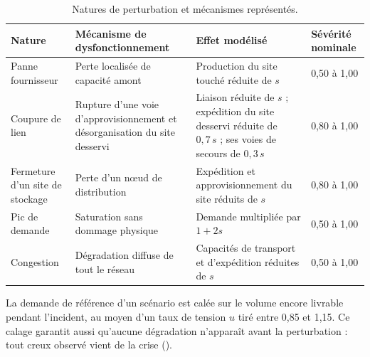 \begin{table}[htbp]
\caption{Natures de perturbation et mécanismes représentés.}
\label{tab:d3}
\footnotesize
\begin{tabularx}{\textwidth}{@{}P{2.4cm}LLP{1.7cm}@{}}
\toprule
\textbf{Nature} & \textbf{Mécanisme de dysfonctionnement} & \textbf{Effet modélisé} & \textbf{Sévérité nominale} \\
\toprule
Panne fournisseur & Perte localisée de capacité amont & Production du site touché réduite de $s$ & 0,50 à 1,00 \\
\midrule
Coupure de lien & Rupture d'une voie d'approvisionnement et désorganisation du site desservi & Liaison réduite de $s$ ; expédition du site desservi réduite de $0{,}7\,s$ ; ses voies de secours de $0{,}3\,s$ & 0,80 à 1,00 \\
\midrule
Fermeture d'un site de stockage & Perte d'un nœud de distribution & Expédition et approvisionnement du site réduits de $s$ & 0,80 à 1,00 \\
\midrule
Pic de demande & Saturation sans dommage physique & Demande multipliée par $1 + 2s$ & 0,50 à 1,00 \\
\midrule
Congestion & Dégradation diffuse de tout le réseau & Capacités de transport et d'expédition réduites de $s$ & 0,50 à 1,00 \\
\bottomrule
\end{tabularx}
\end{table}

La demande de référence d'un scénario est calée sur le volume encore livrable pendant l'incident, au moyen d'un taux de tension $u$ tiré entre 0,85 et 1,15. Ce calage garantit aussi qu'aucune dégradation n'apparaît avant la perturbation : tout creux observé vient de la crise ().

